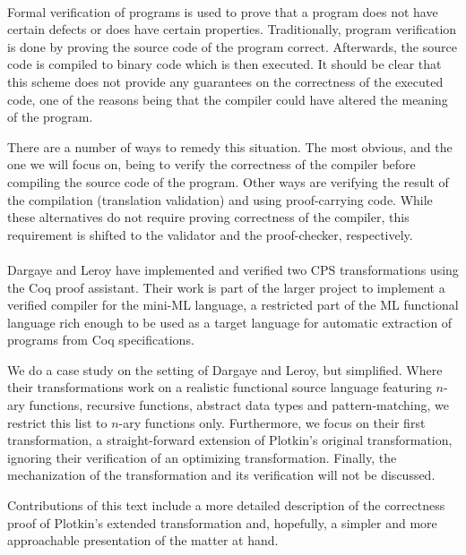\documentclass[a4paper,11pt,draft]{article}
\begin{document}
\paragraph{}

Formal verification of programs is used to prove that a program does not have certain
defects or does have certain properties. Traditionally, program verification is done
by proving the source code of the program correct. Afterwards, the source code is
compiled to binary code which is then executed. It should be clear that this scheme
does not provide any guarantees on the correctness of the executed code, one of the
reasons being that the compiler could have altered the meaning of the program.

There are a number of ways to remedy this situation. The most obvious, and the one we
will focus on, being to verify the correctness of the compiler before compiling the
source code of the program. Other ways are verifying the result of the compilation
(translation validation) and using proof-carrying code. While these alternatives do
not require proving correctness of the compiler, this requirement is shifted to the
validator and the proof-checker, respectively.

\paragraph{}

Dargaye and Leroy \cite{Dargaye-Leroy-07} have implemented and verified two CPS
transformations using the Coq proof assistant. Their work is part of the larger
project to implement a verified compiler for the mini-ML language, a restricted part
of the ML functional language rich enough to be used as a target language for
automatic extraction of programs from Coq specifications.

We do a case study on the setting of Dargaye and Leroy, but simplified. Where their
transformations work on a realistic functional source language featuring $n$-ary
functions, recursive functions, abstract data types and pattern-matching, we restrict
this list to $n$-ary functions only. Furthermore, we focus on their first
transformation, a straight-forward extension of Plotkin's original transformation,
ignoring their verification of an optimizing transformation. Finally, the
mechanization of the transformation and its verification will not be discussed.

Contributions of this text include a more detailed description of the correctness
proof of Plotkin's extended transformation and, hopefully, a simpler and more
approachable presentation of the matter at hand.
\end{document}

